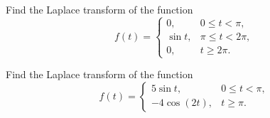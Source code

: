 \documentclass[12pt, a4paper]{article}
\begin{document}
\clearpage

\begin{problem}
	Find the Laplace transform of the function
	\[
	f(t)=
	\begin{cases}
	0, & 0\le t<\pi,\\
	\sin t, & \pi\le t<2\pi,\\
	0, & t\ge 2\pi.
	\end{cases}
	\]
\end{problem}

\clearpage

\begin{problem}
	Find the Laplace transform of the function
	\[
	f(t)=
	\begin{cases}
	5\sin t, & 0\le t<\pi,\\
	-4\cos(2t), & t\ge \pi.
	\end{cases}
	\]
\end{problem}

\clearpage



\EndPage
\end{document}
